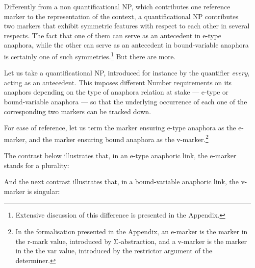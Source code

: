 \documentclass[output=paper
	        ,collection
	        ,collectionchapter
 	        ,biblatex
                ,babelshorthands
                ,newtxmath
                ,draftmode
                ,colorlinks, citecolor=brown
]{langscibook}
\begin{document}

Differently from a non quantificational NP, which contributes
one reference marker to the representation of the context, a quantificational
NP contributes two markers that exhibit symmetric features
with respect to each other in several respects. 
The fact that
one of them can serve as an antecedent in e-type anaphora, while
the other can serve as an antecedent in bound-variable anaphora is certainly
one of such symmetries.\footnote
{Extensive discussion  of this difference is presented in the Appendix.}
 But there are more.

Let us take a quantificational NP, introduced for instance by the quantifier {\em every}, 
acting as an antecedent. This imposes
different Number requirements on its anaphors depending on the
type of anaphora relation at stake --- e-type or bound-variable anaphora --- so that the
underlying occurrence of each one of the corresponding
two markers can be tracked down.


For ease of reference, let us term the marker ensuring e-type anaphora as the e-marker, 
and the marker ensuring bound anaphora as the v-marker.\footnote{
In the formalisation presented in the Appendix, an e-marker is the marker in the {\sc r-mark} value, 
introduced by \mbox{Σ-abstraction}, 
and a v-marker is the marker in the the {\sc var} value,
introduced by the restrictor argument of the determiner.}

The contrast below illustrates that, in an e-type anaphoric link, the e-marker stands for a plurality:

\begin{exe}
\end{exe}

And the next contrast illustrates that, in a bound-variable anaphoric link, the v-marker is singular:

\begin{exe}
\end{exe}
\end{document}
